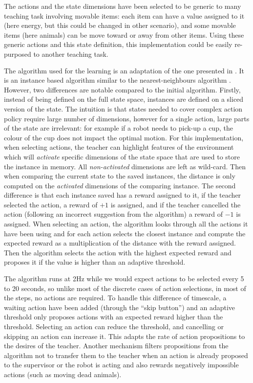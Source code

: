 The actions and the state dimensions have been selected to be generic to many teaching task involving movable items: each item can have a value assigned to it (here energy, but this could be changed in other scenario), and some movable items (here animals) can be move toward or away from other items. Using these generic actions and this state definition, this implementation could be easily re-purposed to another teaching task.

The algorithm used for the learning is an adaptation of the one presented in \cite{senft2017toward}. It is an instance based algorithm similar to the nearest-neighbours algorithm \cite{cover1967nearest}. However, two differences are notable compared to the initial algorithm. Firstly, instead of being defined on the full state space, instances are defined on a sliced version of the state. The intuition is that states needed to cover complex action policy require large number of dimensions, however for a single action, large parts of the state are irrelevant: for example if a robot needs to pick-up a cup, the colour of the cup does not impact the optimal motion. For this implementation, when selecting actions, the teacher can highlight features of the environment which will \textit{activate} specific dimensions of the state space that are used to store the instance in memory. All \textit{non-activated} dimensions are left as wild-card. Then when comparing the current state to the saved instances, the distance is only computed on the \textit{activated} dimensions of the comparing instance. The second difference is that each instance saved has a reward assigned to it, if the teacher selected the action, a reward of $+1$ is assigned, and if the teacher cancelled the action (following an incorrect suggestion from the algorithm) a reward of $-1$ is assigned. When selecting an action, the algorithm looks through all the actions it have been using and for each action selects the closest instance and compute the expected reward as a multiplication of the distance with the reward assigned. Then the algorithm selects the action with the highest expected reward and proposes it if the value is higher than an adaptive threshold. 

The algorithm runs at 2Hz while we would expect actions to be selected every 5 to 20 seconds, so unlike most of the discrete cases of action selections, in most of the steps, no actions are required. To handle this difference of timescale, a waiting action have been added (through the ``skip button'') and an adaptive threshold only proposes actions with an expected reward higher than the threshold. Selecting an action can reduce the threshold, and cancelling or skipping an action can increase it. This adapts the rate of action propositions to the desires of the teacher. Another mechanism filters propositions from the algorithm not to transfer them to the teacher when an action is already proposed to the supervisor or the robot is acting and also rewards negatively impossible actions (such as moving dead animals).

